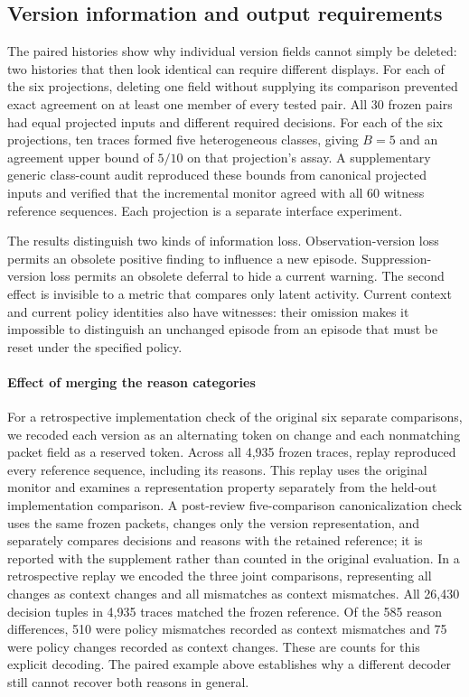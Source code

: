 \documentclass[preprint,11pt]{elsarticle}
\begin{document}
\subsection{Version information and output requirements}
The paired histories show why individual version fields cannot simply be deleted: two histories that then look identical can require different displays. For each of the six projections, deleting one field without supplying its comparison prevented exact agreement on at least one member of every tested pair. All 30 frozen pairs had equal projected inputs and different required decisions. For each of the six projections, ten traces formed five heterogeneous classes, giving $B=5$ and an agreement upper bound of $5/10$ on that projection's assay. A supplementary generic class-count audit reproduced these bounds from canonical projected inputs and verified that the incremental monitor agreed with all 60 witness reference sequences. Each projection is a separate interface experiment.

The results distinguish two kinds of information loss. Observation-version loss permits an obsolete positive finding to influence a new episode. Suppression-version loss permits an obsolete deferral to hide a current warning. The second effect is invisible to a metric that compares only latent activity. Current context and current policy identities also have witnesses: their omission makes it impossible to distinguish an unchanged episode from an episode that must be reset under the specified policy.

\paragraph{Effect of merging the reason categories}
For a retrospective implementation check of the original six separate comparisons, we recoded each version as an alternating token on change and each nonmatching packet field as a reserved token. Across all 4,935 frozen traces, replay reproduced every reference sequence, including its reasons. This replay uses the original monitor and examines a representation property separately from the held-out implementation comparison. A post-review five-comparison canonicalization check uses the same frozen packets, changes only the version representation, and separately compares decisions and reasons with the retained reference; it is reported with the supplement rather than counted in the original evaluation.
In a retrospective replay we encoded the three joint comparisons, representing all changes as context changes and all mismatches as context mismatches. All 26,430 decision tuples in 4,935 traces matched the frozen reference. Of the 585 reason differences, 510 were policy mismatches recorded as context mismatches and 75 were policy changes recorded as context changes. These are counts for this explicit decoding. The paired example above establishes why a different decoder still cannot recover both reasons in general.
\end{document}
